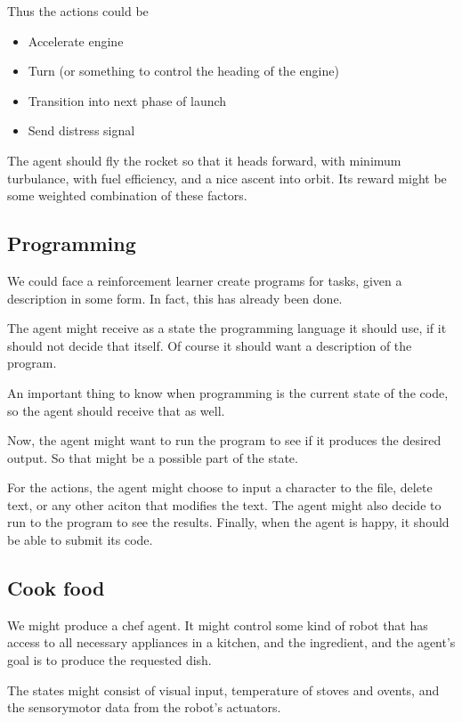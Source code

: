 \documentclass[a4paper,11pt,reqno]{amsart}
\newcounter{temp}
\begin{document}
Thus the actions could be
\begin{itemize}
    \item   Accelerate engine
    \item   Turn (or something to control the heading of the engine)
    \item   Transition into next phase of launch
    \item   Send distress signal
\end{itemize}

The agent should fly the rocket so that it heads forward, with minimum turbulance, with fuel efficiency, and a nice ascent into orbit. Its reward might be some weighted combination of these factors. 

\subsection*{Programming}

We could face a reinforcement learner create programs for tasks, given a description in some form. In fact, this has already been done. 

The agent might receive as a state the programming language it should use, if it should not decide that itself. Of course it should want a description of the program. 

An important thing to know when programming is the current state of the code, so the agent should receive that as well. 

Now, the agent might want to run the program to see if it produces the desired output. So that might be a possible part of the state. 

For the actions, the agent might choose to input a character to the file, delete text, or any other aciton that modifies the text. The agent might also decide to run to the program to see the results. Finally, when the agent is happy, it should be able to submit its code. 

\subsection*{Cook food}
We might produce a chef agent. It might control some kind of robot that has access to all necessary appliances in a kitchen, and the ingredient, and the agent's goal is to produce the requested dish. 

The states might consist of visual input, temperature of stoves and ovents, and the sensorymotor data from the robot's actuators. 
\end{document}
